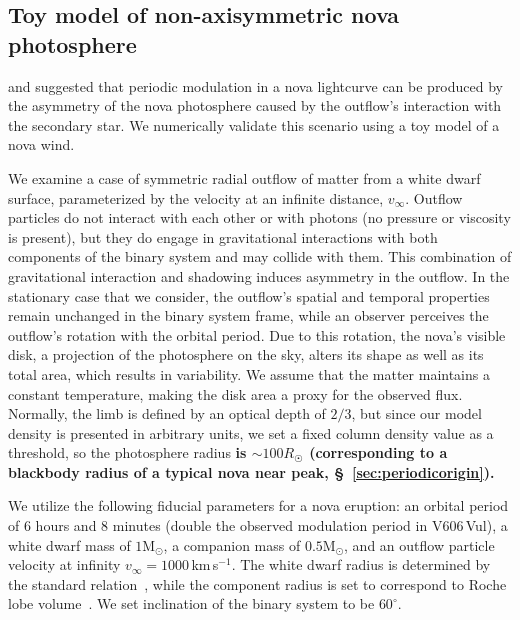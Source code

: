 \documentclass[twocolumn]{aastex631}
\newcommand{\nova}{V606\,Vul}
\begin{document}
\subsection{Toy model of non-axisymmetric nova photosphere}
\label{sec:toymodel}

\cite{1977MNRAS.180..749F} and \cite{2011A&A...536A..97F} suggested that 
periodic modulation in a nova lightcurve can be produced by 
the asymmetry of the nova photosphere caused by the outflow's interaction with the secondary star.
We numerically validate this scenario using a toy model of a nova wind.

We examine a case of symmetric radial outflow of matter from a white dwarf surface, 
parameterized by the velocity at an infinite distance, $v_\infty$.
Outflow particles do not interact with each other or with photons 
(no pressure or viscosity is present), but they do engage in gravitational interactions with both components of 
the binary system and may collide with them.
This combination of gravitational interaction and shadowing induces asymmetry in the outflow.
In the stationary case that we consider, the outflow's spatial and temporal properties remain unchanged in the binary system frame, 
while an observer perceives the outflow's rotation with the orbital period.
Due to this rotation, the nova's visible disk, a projection of the photosphere on the sky, 
alters its shape as well as its total area, which results in variability.
We assume that the matter maintains a constant temperature, 
making the disk area a proxy for the observed flux. 
Normally, the limb is defined by an optical depth of $2/3$, 
but since our model density is presented in arbitrary units, 
we set a fixed column density value as a threshold, 
so the photosphere radius 
{\bf is $\sim 100 R_\Sun$ (corresponding to a blackbody radius of a typical nova near peak, \S~\ref{sec:periodicorigin}).}

We utilize the following fiducial parameters for a nova eruption: 
an orbital period of 6 hours and 8 minutes 
(double the observed modulation period in \nova{}), 
a white dwarf mass of $1 \mathrm{M}_\odot$, 
a companion mass of $0.5 \mathrm{M}_\odot$, 
and an outflow particle velocity at infinity $v_\infty = 1000$\,km\,s$^{-1}$.
The white dwarf radius is determined by the standard relation~\citep{chandrasekhar1931}, 
while the component radius is set to correspond to Roche lobe volume~\citep{eggleton1983}.
We set inclination of the binary system to be $60^\circ$.
\end{document}
